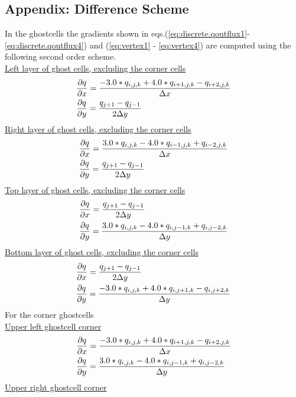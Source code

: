 \documentclass[fleqn]{article}
\begin{document}
{\subsection{Appendix: Difference Scheme}
In the ghostcells the gradients shown in eqs.(\ref{eq:discrete.qoutflux1}- \ref{eq:discrete.qoutflux4}) and (\ref{eq:vertex1} - \ref{eq:vertex4}) are computed using the following second order scheme.\\
%
\underline{Left layer of ghost cells, excluding the corner cells}
\begin{align}
    &\pd{q}{x} = \frac{-3.0 * q_{i,j,k} + 4.0 * q_{i+1,j,k} - q_{i+2,j,k}}{\delx} \notag \\
    &\pd{q}{y} = \frac{q_{j+1} - q_{j-1}}{2\dely}   \notag \\
\end{align}
%
%
\underline{Right layer of ghost cells, excluding the corner cells}
\begin{align}
    &\pd{q}{x} = \frac{3.0 * q_{i,j,k} - 4.0 * q_{i-1,j,k} + q_{i-2,j,k}}{\delx} \notag \\
    &\pd{q}{y} = \frac{q_{j+1} - q_{j-1}}{2\dely}   \notag \\
\end{align}
%
%
\underline{Top layer of ghost cells, excluding the corner cells}
\begin{align}
    &\pd{q}{x} = \frac{q_{j+1} - q_{j-1}}{2\dely}   \notag \\
    &\pd{q}{y} = \frac{3.0 * q_{i,j,k} - 4.0 * q_{i,j-1,k} + q_{i,j-2,k}}{\dely} \notag \\
\end{align}
%
%
\underline{Bottom layer of ghost cells, excluding the corner cells}
\begin{align}
    &\pd{q}{x} = \frac{q_{j+1} - q_{j-1}}{2\dely}   \notag \\
    &\pd{q}{y} = \frac{-3.0 * q_{i,j,k} + 4.0 * q_{i,j+1,k} - q_{i,j+2,k}}{\dely} \notag \\
\end{align}
%
%
For the corner ghostcells \\
\underline{Upper left ghostcell corner}
\begin{align}
    &\pd{q}{x} = \frac{-3.0 * q_{i,j,k} + 4.0 * q_{i+1,j,k} - q_{i+2,j,k}}{\delx} \notag \\
    &\pd{q}{y} = \frac{3.0 * q_{i,j,k} - 4.0 * q_{i,j-1,k} + q_{i,j-2,k}}{\dely} \notag \\
\end{align}
%
%
\underline{Upper right ghostcell corner}
}
\end{document}
